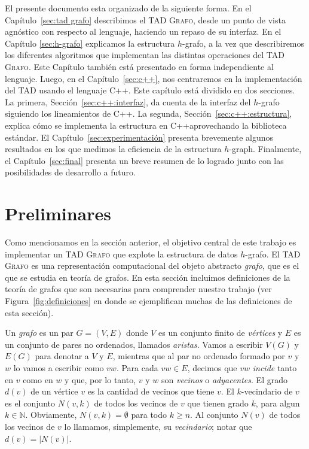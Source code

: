 \documentclass[%
    a4paper,%
    fontsize=12pt,%
    DIV=12,
    twoside,%
    openright,%
    titlepage=true,%
    headsepline,%
    toc=bibliography,%
    parskip=half,%
    cleardoublepage=empty,%
    headings=big,%
]{scrbook}
\newcommand{\Grafo}{\textsc{Grafo}\xspace}
\DeclareRobustCommand{\CPP}{C\nolinebreak[4]\hspace{-.05em}\raisebox{.4ex}{\relsize{-3}\textbf{++}}\xspace}
\def\CPP{C++}%
\begin{document}
El presente documento esta organizado de la siguiente forma.  En el Capítulo~\ref{sec:tad grafo} describimos el TAD \Grafo, desde un punto de vista agnóstico con respecto al lenguaje, haciendo un repaso de su interfaz.  En el Capítulo \ref{sec:h-grafo} explicamos la estructura $h$-grafo, a la vez que describiremos los diferentes algoritmos que implementan las distintas operaciones del TAD \Grafo.  Este Capítulo también está presentado en forma independiente al lenguaje.  Luego, en el Capítulo~\ref{sec:c++}, nos centraremos en la implementación del TAD usando el lenguaje \CPP. Este capítulo está dividido en dos secciones. La primera, Sección~\ref{sec:c++:interfaz}, da cuenta de la interfaz del $h$-grafo siguiendo los lineamientos de \CPP. La segunda, Sección~\ref{sec:c++:estructura}, explica cómo se implementa la estructura en \CPP aprovechando la biblioteca estándar.  El Capítulo~\ref{sec:experimentación} presenta brevemente algunos resultados en los que medimos la eficiencia de la estructura $h$-graph.  Finalmente, el Capítulo~\ref{sec:final} presenta un breve resumen de lo logrado junto con las posibilidades de desarrollo a futuro.

\section{Preliminares}
\label{sec:definiciones}

Como mencionamos en la sección anterior, el objetivo central de este trabajo es implementar un TAD \Grafo que explote la estructura de datos $h$-grafo.  El TAD \Grafo es una representación computacional del objeto abstracto \emph{grafo}, que es el que se estudia en teoría de grafos.  En esta sección incluimos definiciones de la teoría de grafos que son necesarias para comprender nuestro trabajo (ver Figura~\ref{fig:definiciones} en donde se ejemplifican muchas de las definiciones de esta sección).

Un \emph{grafo} es un par $G = (V, E)$ donde $V$ es un conjunto finito de \emph{vértices} y $E$ es un conjunto de pares no ordenados, llamados \emph{aristas}.  Vamos a escribir $V(G)$ y $E(G)$ para denotar a $V$ y $E$, mientras que al par no ordenado formado por $v$ y $w$ lo vamos a escribir como $vw$.  Para cada $vw \in E$, decimos que $vw$ \emph{incide} tanto en $v$ como en $w$ y que, por lo tanto, $v$ y $w$ son \emph{vecinos} o \emph{adyacentes}.  El grado $d(v)$ de un vértice $v$ es la cantidad de vecinos que tiene $v$.  El $k$-vecindario de $v$ es el conjunto $N(v, k)$ de todos los vecinos de $v$ que tienen grado $k$, para algun $k \in \mathbb{N}$.  Obviamente, $N(v,k) = \emptyset$ para todo $k \geq n$.  Al conjunto $N(v)$ de todos los vecinos de $v$ lo llamamos, simplemente, su \emph{vecindario}; notar que $d(v) = |N(v)|$.
\end{document}
